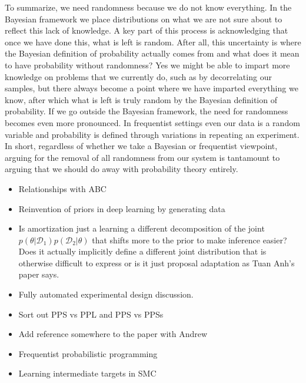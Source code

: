 To summarize, we need randomness because we do not know everything.  In the Bayesian framework we place distributions
on what we are not sure about to reflect this lack of knowledge.  A key part of this process is acknowledging that once we
have done this, what is left is random.  After all, this uncertainty is where the Bayesian definition of probability actually comes
from and what does it mean to have probability without randomness?  Yes we might be able to impart more knowledge on
problems that we currently do, such as by decorrelating our samples, but there always become a point where we have
imparted everything we know, after which what is left is truly random by the Bayesian definition of
probability.  If we go outside the Bayesian framework, the need for randomness becomes even more pronounced.  In
frequentist settings even our data is a random variable and probability is defined through variations in repeating an
experiment.  In short, regardless of whether we take a Bayesian or frequentist viewpoint, arguing for the 
removal of all randomness from our system is tantamount to arguing that we should do away with probability
theory entirely.


\begin{itemize}
	\item Relationships with ABC
	\item Reinvention of priors in deep learning by generating data
	\item Is amortization just a learning a different decomposition of the joint 
	$p(\theta | \mathcal{D}_1)p(\mathcal{D}_2|\theta)$ that shifts more to the
	prior to make inference easier?  Does it actually implicitly define a different
	joint distribution that is otherwise difficult to express or is it just proposal
	adaptation as Tuan Anh's paper says.
	\item Fully automated experimental design discussion.
	\item Sort out PPS vs PPL and PPS vs PPSs
	\item Add reference somewhere to the paper with Andrew
	\item Frequentist probabilistic programming
	\item Learning intermediate targets in SMC
\end{itemize}